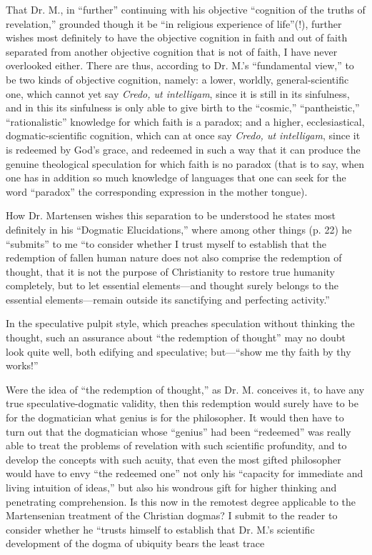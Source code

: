 \documentclass[12pt,a4paper,openany]{book}
\newcommand{\opage}[1]{\marginnote{\footnotesize\textit{[#1]}}}
\begin{document}
That Dr. M., in ``further'' continuing with his objective
``cognition of the truths of revelation,'' grounded though it be ``in religious experience of life''(!),
further wishes most definitely to have the objective cognition in
faith and out of faith separated from another objective cognition
that is not of faith, I have never overlooked either.
There are thus, according to Dr. M.'s ``fundamental view,'' to be two
kinds of objective cognition, namely: a lower, worldly, general-scientific one,
which cannot yet say \textit{Credo, ut intelligam},
since it is still in its sinfulness, and in this its
sinfulness is only able to give birth to the ``cosmic,'' ``pantheistic,''
``rationalistic'' knowledge for which faith is a paradox; and a higher, ecclesiastical, dogmatic-scientific cognition,
which can at once say \textit{Credo, ut intelligam}, since
it is redeemed by God's grace, and redeemed in such a way that
it can produce the genuine theological speculation for
which faith is no paradox (that is to say, when one
has in addition so much knowledge of languages that one can seek for the word
``paradox'' the corresponding expression in the mother tongue).

How Dr. Martensen wishes this separation to be
\setcounter{footnote}{0}%
\opage{38}understood he states most definitely in his ``Dogmatic
Elucidations,'' where among other things (p. 22) he ``submits''
to me ``to consider whether I trust myself to establish
that the redemption of fallen human nature does not
also comprise the redemption of thought, that it is not the purpose of Christianity
to restore true humanity completely,
but to let essential elements---and thought
surely belongs to the essential elements---remain outside
its sanctifying and perfecting activity.''

In the speculative pulpit style, which preaches speculation
without thinking the thought, such an assurance about
``the redemption of thought'' may no doubt look quite well, both
edifying and speculative; but---``show me thy faith
by thy works!''

Were the idea of ``the redemption of thought,'' as
Dr. M. conceives it, to have any true speculative-dogmatic
validity, then this redemption would surely have to be for the dogmatician
what genius is for the philosopher. It would
then have to turn out that the dogmatician whose ``genius'' had been
``redeemed'' was really able to treat the problems of revelation
with such scientific profundity, and
to develop the concepts with such acuity, that even the
most gifted philosopher would have to envy ``the redeemed one''
not only his ``capacity for immediate and living intuition of ideas,''
but also his wondrous gift for higher thinking
and penetrating comprehension. Is this now in the remotest
degree applicable to the Martensenian treatment of the
Christian dogmas? I submit to the reader to consider
whether he ``trusts himself to establish that Dr. M.'s scientific
development of the dogma of ubiquity bears the least trace
\end{document}
